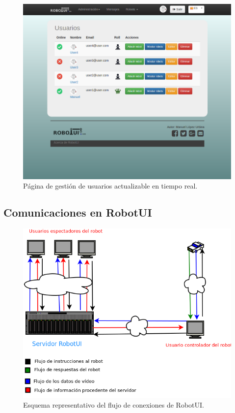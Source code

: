\begin{figure}[H]
  \begin{center}
    \includegraphics[scale=0.35]{imagenes/comunicaciones/index-usuarios.png}
  \end{center}
  \caption{Página de gestión de usuarios actualizable en tiempo real.}
  \label{view:userindex}
\end{figure}



\subsection{ Comunicaciones en RobotUI}
\label{sec:comunicaciones-robotui}


\begin{figure}[H]
  \begin{center}
    \includegraphics[scale=0.5]{diagramas/flujo-comunicaciones.png}
  \end{center}
  \caption{Esquema representativo del flujo de conexiones de RobotUI.}
  \label{diagram:conexiones}
\end{figure}
 

